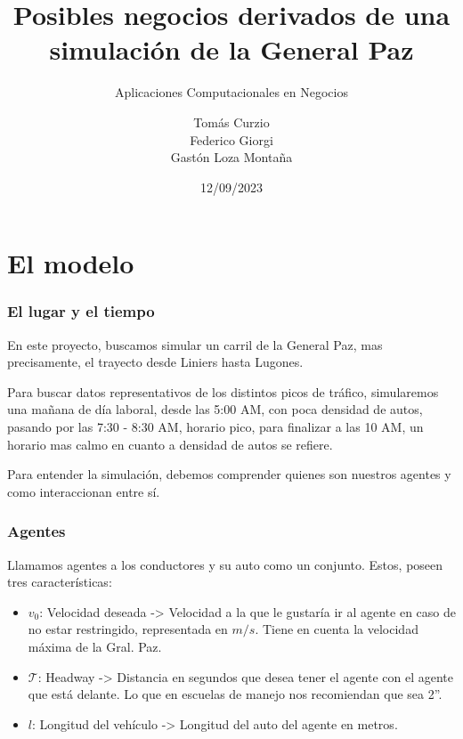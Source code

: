\documentclass[10pt, compress]{beamer}
\title{Posibles negocios derivados de una simulaci\'on de la General Paz }
\subtitle{Aplicaciones Computacionales en Negocios}
\date{12/09/2023}
\author{Tom\'as Curzio \\ Federico Giorgi \\ Gast\'on Loza Monta\~na  }
\institute{Universidad Torcuato Di Tella}
\begin{document}
\maketitle

\section{El modelo}

\begin{frame}[fragile]

\frametitle{El lugar y el tiempo}
En este proyecto, buscamos simular un carril de la General Paz, mas precisamente, el trayecto desde Liniers hasta Lugones. 

Para buscar datos representativos de los distintos picos de tr\'afico, simularemos una ma\~nana de d\'ia laboral, desde las 5:00 AM, con poca densidad de autos, pasando por las 7:30 - 8:30 AM, horario pico, para finalizar a las 10 AM, un horario mas calmo en cuanto a densidad de autos se refiere.

Para entender la simulaci\'on, debemos comprender quienes son nuestros agentes y como interaccionan entre s\'i.

\end{frame}

\begin{frame}[fragile]

\frametitle{Agentes}

Llamamos agentes a los conductores y su auto como un conjunto. Estos, poseen tres caracter\'isticas:

\begin{itemize}
\item $v_0$: Velocidad deseada -> Velocidad a la que le gustar\'ia ir al agente en caso de no estar restringido, representada en $m/s$. Tiene en cuenta la velocidad m\'axima de la Gral. Paz.
\item $\mathcal{T}$: Headway -> Distancia en segundos que desea tener el agente con el agente que est\'a delante. Lo que en escuelas de manejo nos recomiendan que sea 2''.
\item $l$: Longitud del veh\'iculo -> Longitud del auto del agente en metros.
\end{itemize}

\end{frame}
\end{document}
